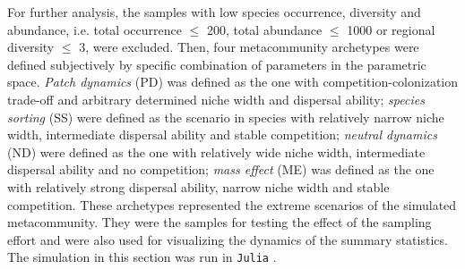For further analysis, the samples with low species occurrence, diversity and abundance, i.e. total occurrence $\leq$ 200, total abundance $\leq$ 1000 or regional diversity $\leq$ 3, were excluded. Then, four metacommunity archetypes were defined subjectively by \DIFdelbegin {}\DIFdelend \DIFaddbegin {}\DIFaddend specific combination of parameters in the parametric space. \textit{Patch dynamics} (PD) was defined as the one with competition-colonization trade-off and arbitrary determined niche width and dispersal ability; \textit{species sorting} (SS) were defined as the scenario in species with relatively narrow niche width, intermediate dispersal ability and stable competition; \textit{neutral dynamics} (ND) were defined as the one with relatively wide niche width, intermediate dispersal ability and no competition; \textit{mass effect} (ME) was defined as the one with relatively strong dispersal ability, narrow niche width and stable competition. These archetypes represented the extreme scenarios of the simulated metacommunity. They were the samples for testing the effect of the sampling effort and were also used for visualizing the dynamics of the summary statistics. The simulation in this section was run in \texttt{Julia} \citep{bezanson2017julia}.

